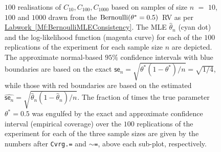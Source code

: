 \begin{figure}[ht]
\caption{{\small $100$ realisations of $C_{10}, C_{100}, C_{1000}$ based on samples of size $n$ $=$ $10$, $100$ and $1000$ drawn from the $\mbox{{\rm Bernoulli}}(\theta^*=0.5)$ RV as per \hyperref[Mf:BernoulliMLEConsistency]{Labwork~\ref*{Mf:BernoulliMLEConsistency}}.  The MLE $\widehat{\theta}_n$ (cyan dot) and the log-likelihood function (magenta curve) for each of the $100$ replications of the experiment for each sample size $n$ are depicted.  The approximate normal-based $95\%$ confidence intervals with blue boundaries are based on the exact $\mathsf{se}_n=\sqrt{\theta^*(1-\theta^*)/n}=\sqrt{1/4}$, while those with red boundaries are based on the estimated $\widehat{\mathsf{se}_n}=\sqrt{\widehat{\theta}_n(1-\widehat{\theta}_n)/n}$.  The fraction of times the true parameter $\theta^*=0.5$ was engulfed by the exact and approximate confidence interval (empirical coverage) over the $100$ replications of the experiment for each of the three sample sizes are given by the numbers after {\tt Cvrg.=} and {\tt $\sim$=}, above each sub-plot, respectively.}\label{F:BernoulliMLEConsistency}}
\begin{center}
\end{center}
\end{figure}  







